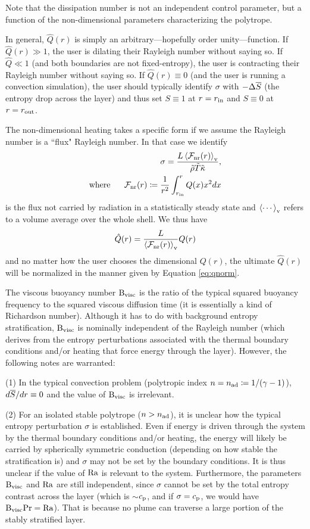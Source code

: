 \documentclass[12pt]{article}
\numberwithin{equation}{section}
\newcommand{\nad}{n_{\rm{ad}}}
\begin{document}
Note that the dissipation number is not an independent control parameter, but a function of the non-dimensional parameters characterizing the polytrope. 

In general, $\hat{Q}(r)$ is simply an arbitrary---hopefully order unity---function. If $\hat{Q}(r)\gg1$, the user is dilating their Rayleigh number without saying so. If $\hat{Q}\ll1$ (and both boundaries are not fixed-entropy), the user is contracting their Rayleigh number without saying so. If $\hat{Q}(r)\equiv0$ (and the user is running a convection simulation), the user should typically identify $\sigma$ with $-\Delta\overline{S}$ (the entropy drop across the layer) and thus set $S\equiv1$ at $r=r_{\rm{in}}$ and $S\equiv0$ at $r=r_{\rm{out}}$.
 
The non-dimensional heating takes a specific form if we assume the Rayleigh number is a ``flux" Rayleigh number. In that case we identify
\begin{align}
	\sigma = \frac{L \left\langle{\mathcal{F}}_{\rm{nr}}(r)\right\rangle_{\rm{v}}}{\tilde{\rho}\tilde{T}\tilde{\kappa}},\\
	\text{where}\ \ \ \ \  {\mathcal{F}}_{\rm{nr}}(r) \coloneqq \frac{1}{r^2}\int_{r_{\rm{in}}}^r Q(x) x^2 dx
\end{align}
is the flux not carried by radiation in a statistically steady state and $\left\langle\cdots\right\rangle_{\rm{v}}$ refers to a volume average over the whole shell. We thus have
\begin{align}\label{eq:qnorm}
	\hat{Q}(r) = \frac{L}{\left\langle{\mathcal{F}}_{\rm{nr}}(r)\right\rangle_{\rm{v}}}Q(r)
\end{align}
and no matter how the user chooses the dimensional $Q(r)$, the ultimate $\hat{Q}(r)$ will be normalized in the manner given by Equation \eqref{eq:qnorm}. 

The viscous buoyancy number ${\rm{B_{visc}}}$ is the ratio of the typical squared buoyancy frequency to the squared viscous diffusion time (it is essentially a kind of Richardson number). Although it has to do with background entropy stratification, ${\rm{B_{visc}}}$ is nominally independent of the Rayleigh number (which derives from the entropy perturbations associated with the thermal boundary conditions and/or heating that force energy through the layer). However, the following notes are warranted: 

(1) In the typical convection problem (polytropic index $n=\nad\define1/(\gamma-1)$), $d\overline{S}/dr\equiv0$ and the value of ${\rm{B_{visc}}}$ is irrelevant. 

(2) For an isolated stable polytrope ($n>\nad$), it is unclear how the typical entropy perturbation $\sigma$ is established. Even if energy is driven through the system by the thermal boundary conditions and/or heating, the energy will likely be carried by spherically symmetric conduction (depending on how stable the stratification is) and $\sigma$ may not be set by the boundary conditions. It is thus unclear if the value of ${\rm{Ra}}$ is relevant to the system. Furthermore, the parameters ${\rm{B_{visc}}}$ and ${\rm{Ra}}$ are still independent, since $\sigma$ cannot be set by the total entropy contrast across the layer (which is $\sim$$c_{\rm{p}}$, and if $\sigma=c_{\rm{p}}$, we would have ${\rm{B_{visc}}}{\rm{Pr}} = {\rm{Ra}}$). That is because no plume can traverse a large portion of the stably stratified layer. 
\end{document}
